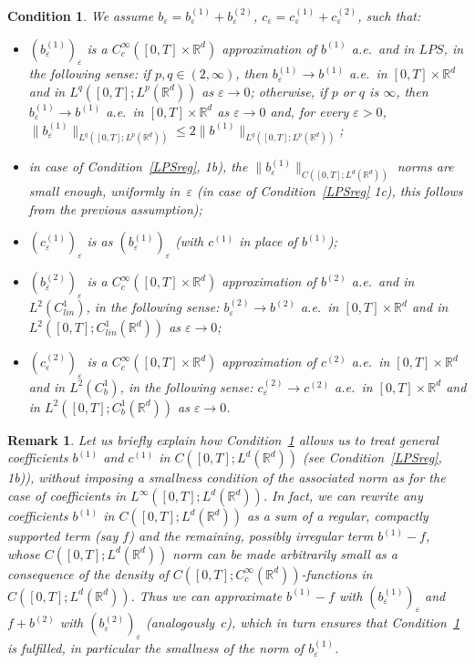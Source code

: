 \documentclass[a4paper,10pt]{article}
\newtheorem{condition}[theorem]{Condition}
\newtheorem{remark}[theorem]{Remark}
\newcommand\1{\mathbbm{1}}
\newcommand{\mr}{\mathbb{R}}
\newcommand{\eps}{\varepsilon}
\numberwithin{equation}{section}
\begin{document}
\begin{condition}\label{LPSappprox}
We assume $b_\eps=b^{(1)}_\eps+b^{(2)}_\eps$, $c_\eps=c^{(1)}_\eps+c^{(2)}_\eps$, such that:
\begin{itemize}
\item $(b^{(1)}_\eps)_\eps$ is a $C^\infty_c([0,T]\times\mr^d)$ approximation of $b^{(1)}$ a.e.~and in $LPS$, in the following sense: if $p,q \in (2,\infty)$, then $b^{(1)}_\eps\rightarrow b^{(1)}$ a.e.~in $[0,T]\times\mr^d$ and in $L^q([0,T];L^p(\mr^d))$ as $\eps\rightarrow0$; otherwise, if $p$ or $q$ is $\infty$, then $b^{(1)}_\eps\rightarrow b^{(1)}$ a.e.~in $[0,T]\times\mr^d$ as $\eps\rightarrow0$ and, for every $\eps>0$, $\|b^{(1)}_\eps\|_{L^q([0,T];L^p(\mr^d))}\le 2\|b^{(1)}\|_{L^q([0,T];L^p(\mr^d))}$;
\item in case of Condition~\ref{LPSreg}, \textup{1b)}, the $\|b^{(1)}_\eps\|_{C([0,T];L^d(\mr^d))}$ norms are small enough, uniformly in~$\eps$ \textup{(}in case of Condition~\ref{LPSreg} \textup{1c)}, this follows from the previous assumption\textup{)};
\item $(c^{(1)}_\eps)_\eps$ is as $(b^{(1)}_\eps)_\eps$ \textup{(}with $c^{(1)}$ in place of $b^{(1)}$\textup{)};
\item $(b^{(2)}_\eps)_\eps$ is a $C^\infty_c([0,T]\times\mr^d)$ approximation of $b^{(2)}$ a.e.~and in $L^2(C^1_{lin})$, in the following sense: $b^{(2)}_\eps\rightarrow b^{(2)}$ a.e.~in $[0,T]\times\mr^d$ and in $L^2([0,T];C^1_{lin}(\mr^d))$ as $\eps\rightarrow0$;
\item $(c^{(2)}_\eps)_\eps$ is a $C^\infty_c([0,T]\times\mr^d)$ approximation of $c^{(2)}$ a.e.~in $[0,T]\times\mr^d$ and in $L^2(C^1_b)$, in the following sense: $c^{(2)}_\eps\rightarrow c^{(2)}$ a.e.~in $[0,T]\times\mr^d$ and in $L^2([0,T];C^1_b(\mr^d))$ as $\eps\rightarrow0$.
\end{itemize}
\end{condition}

\begin{remark}
Let us briefly explain how Condition~\ref{LPSappprox} allows us to treat general coefficients $b^{(1)}$ and $c^{(1)}$ in $C([0,T];L^d(\mr^d))$ \textup{(}see Condition~\ref{LPSreg}, \textup{1b)}\textup{)}, without imposing a smallness condition of the associated norm as for the case of coefficients in $L^\infty([0,T];L^d(\mr^d))$. In fact, we can rewrite any coefficients $b^{(1)}$ in $C([0,T];L^d(\mr^d))$ as a sum of a regular, compactly supported term \textup{(}say $f$\textup{)} and the remaining, possibly irregular term $b^{(1)} - f$, whose $C([0,T];L^d(\mr^d))$ norm can be made arbitrarily small as a consequence of the density of $C([0,T];C^\infty_c(\mr^d))$-functions in $C([0,T];L^d(\mr^d))$. Thus we can approximate $b^{(1)} - f$ with $(b^{(1)}_\eps)_\eps$ and $f+b^{(2)}$ with $(b^{(2)}_\eps)_\eps$ \textup{(}analogously~$c$\textup{)}, which in turn ensures that Condition~\ref{LPSappprox} is fulfilled, in particular the smallness of the norm of $b^{(1)}_\eps$.
\end{remark}
\end{document}
